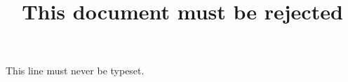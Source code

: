\documentclass[titlepage,nominted]{pt-article}
\title{This document must be rejected}
\begin{document}
This line must never be typeset.
\end{document}
